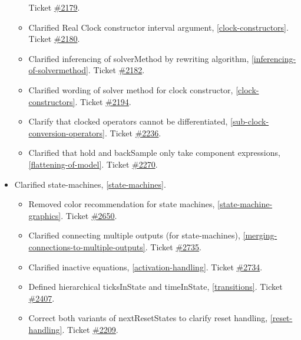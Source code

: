 \begin{itemize}
\begin{itemize}
Ticket \href{https://github.com/modelica/ModelicaSpecification/issues/2179}{\#2179}.
\item Clarified Real Clock constructor interval argument, \cref{clock-constructors}.
Ticket \href{https://github.com/modelica/ModelicaSpecification/issues/2180}{\#2180}.
\item Clarified inferencing of solverMethod by rewriting algorithm, \cref{inferencing-of-solvermethod}.
Ticket \href{https://github.com/modelica/ModelicaSpecification/issues/2182}{\#2182}.
\item Clarified wording of solver method for clock constructor, \cref{clock-constructors}.
Ticket \href{https://github.com/modelica/ModelicaSpecification/issues/2194}{\#2194}.
\item Clarify that clocked operators cannot be differentiated, \cref{sub-clock-conversion-operators}.
Ticket \href{https://github.com/modelica/ModelicaSpecification/issues/2236}{\#2236}.
\item Clarified that hold and backSample only take component expressions, \cref{flattening-of-model}.
Ticket \href{https://github.com/modelica/ModelicaSpecification/issues/2270}{\#2270}.
\end{itemize}

\item Clarified state-machines, \cref{state-machines}.
\begin{itemize}
\item Removed color recommendation for state machines, \cref{state-machine-graphics}.
Ticket \href{https://github.com/modelica/ModelicaSpecification/issues/2650}{\#2650}.
\item Clarified connecting multiple outputs (for state-machines), \cref{merging-connections-to-multiple-outputs}.
Ticket \href{https://github.com/modelica/ModelicaSpecification/pull/2735}{\#2735}.
\item Clarified inactive equations, \cref{activation-handling}.
Ticket \href{https://github.com/modelica/ModelicaSpecification/pull/2734}{\#2734}.
\item Defined hierarchical ticksInState and timeInState, \cref{transitions}.
Ticket \href{https://github.com/modelica/ModelicaSpecification/issues/2407}{\#2407}.
\item Correct both variants of nextResetStates to clarify reset handling, \cref{reset-handling}.
Ticket \href{https://github.com/modelica/ModelicaSpecification/issues/2209}{\#2209}.
\end{itemize}



\end{itemize}

